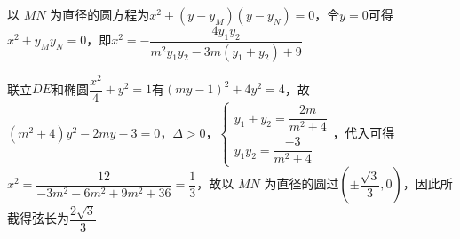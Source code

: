 \begin{enumerate}
\begin{jieda}
\begin{enumerate}
                以 ${MN}$ 为直径的圆方程为$x^2 + (y-y_M)(y-y_N) = 0$，令$y = 0$可得$x^2 + y_My_N = 0$，即$x^2 = - \dfrac{4y_1y_2}{m^2y_1y_2 - 3m(y_1+y_2) + 9}$

                联立$DE$和椭圆$\dfrac{x^2}{4}+y^2 = 1$有$(my-1)^2+4y^2 = 4$，故$(m^2+4)y^2-2my-3 = 0$，$\Delta > 0$，$\left\{\begin{array}{l}
                        y_1+y_2 = \dfrac{2m}{m^2+4} \\
                        y_1y_2 = \dfrac{-3}{m^2+4}
                \end{array}\right.$，代入可得$x^2 = \dfrac{12}{-3m^2-6m^2+9m^2+36} = \dfrac{1}{3}$，故以 ${MN}$ 为直径的圆过$\left(\pm \dfrac{\sqrt{3}}{3}, 0\right)$，因此所截得弦长为$\dfrac{2\sqrt{3}}{3}$
        \end{enumerate}
    \end{jieda}


\end{enumerate}
